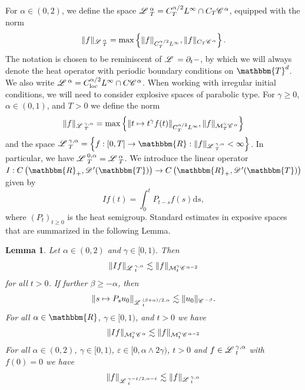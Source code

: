 \documentclass[a4paper,11pt]{article}
\newcommand{\mathd}{\mathrm{d}}
\newcommand{\tmop}[1]{\ensuremath{\operatorname{#1}}}
\newtheorem{lemma}[theorem]{Lemma}
{\theorembodyfont{\rmfamily}\newtheorem{remark}[theorem]{Remark}}
\newcommand{\CC}{\mathscr{C} \hspace{.1em}}
\newcommand{\DD}{\mathscr{D} \hspace{.1em}}
\newcommand{\LL}{\mathscr{L} \hspace{.2em}}
\begin{document}
For $\alpha \in (0, 2)$, we define the space $\LL_T^{\alpha} = C^{\alpha /
2}_T L^{\infty} \cap C_T \CC^{\alpha}$, equipped with the norm
\[ \| f \|_{\LL_T^{\alpha}} = \max \left\{ \| f \|_{C^{\alpha / 2}_T
   L^{\infty}}, \| f \|_{C_T \CC^{\alpha}} \right\} . \]
The notation is chosen to be reminiscent of $\LL = \partial_t -$, by which we
will always denote the heat operator with periodic boundary conditions on
$\mathbbm{T}^d$. We also write $\LL^{\alpha} = C^{\alpha / 2}_{\tmop{loc}}
L^{\infty} \cap C \CC^{\alpha}$. When working with irregular initial
conditions, we will need to consider explosive spaces of parabolic type. For
$\gamma \geqslant 0$, $\alpha \in (0, 1)$, and $T > 0$ we define the norm
\[ \| f \|_{\LL^{\gamma, \alpha}_T} = \max \left\{ \| t \mapsto t^{\gamma} f
   (t) \|_{C^{\alpha / 2}_T L^{\infty}}, \| f \|_{\mathcal{M}^{\gamma}_T
   \CC^{\alpha}} \right\} \]
and the space $\LL^{\gamma, \alpha}_T = \left\{ f : [0, T] \rightarrow
\mathbbm{R}: \| f \|_{\LL^{\gamma, \alpha}_T} < \infty \right\}$. In
particular, we have $\LL^{0, \alpha}_T = \LL^{\alpha}_T$. We introduce the
linear operator $I : C \left( \mathbbm{R}_+, \DD' (\mathbbm{T}) \right)
\rightarrow C \left( \mathbbm{R}_+, \DD' (\mathbbm{T}) \right)$ given by
\[ I f (t) = \int_0^t P_{t - s} f (s) \mathd s, \]
where $(P_t)_{t \geqslant 0}$ is the heat semigroup. Standard estimates in
exposive spaces that are summarized in the following Lemma.

\begin{lemma}
  \label{lemma:schauder}Let $\alpha \in (0, 2)$ and $\gamma \in [0, 1)$. Then
  \begin{equation}
    \label{eq:schauder-heat} \|I f\|_{\LL^{\gamma, \alpha}_t} \lesssim \| f
    \|_{\mathcal{M}^{\gamma}_t \CC^{\alpha - 2}}
  \end{equation}
  for all $t > 0$. If further $\beta \geqslant - \alpha$, then
  \begin{equation}
    \label{eq:schauder initial contribution} \| s \mapsto P_s u_0
    \|_{\LL^{(\beta + \alpha) / 2, \alpha}_t} \lesssim \| u_0 \|_{\CC^{-
    \beta}} .
  \end{equation}
  For all $\alpha \in \mathbbm{R}$, $\gamma \in [0, 1)$, and $t > 0$ we have
  \begin{equation}
    \label{eq:schauder without time hoelder} \|I f\|_{\mathcal{M}^{\gamma}_t
    \CC^{\alpha}} \lesssim \| f \|_{\mathcal{M}^{\gamma}_t \CC^{\alpha - 2}}
  \end{equation}
  For all $\alpha \in (0, 2)$, $\gamma \in [0, 1)$, $\varepsilon \in [0,
  \alpha \wedge 2 \gamma)$, $t > 0$ and $f \in \LL^{\gamma, \alpha}_t$ with $f
  (0) = 0$ we have
  \begin{equation}
    \label{eq:schauder time reg} \| f \|_{\LL^{\gamma - \varepsilon / 2,
    \alpha - \varepsilon}_t} \lesssim \| f \|_{\LL^{\gamma, \alpha}_t}
  \end{equation}
\end{lemma}
\end{document}
